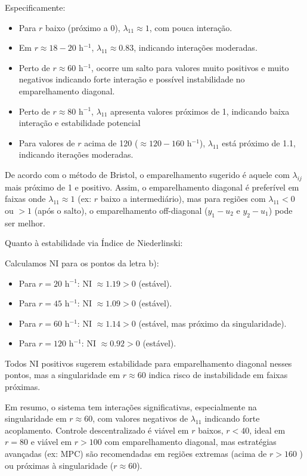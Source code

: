 \documentclass{article}
\begin{document}
Especificamente:
\begin{itemize}
  \item Para $r$ baixo (próximo a 0), $\lambda_{11} \approx 1$, com pouca interação.
  \item Em $r \approx 18-20$ h$^{-1}$, $\lambda_{11} \approx 0.83$, indicando interações moderadas.
  \item Perto de $r \approx 60$ h$^{-1}$, ocorre um salto para valores muito positivos e muito negativos indicando forte interação e possível instabilidade no emparelhamento diagonal.
  \item Perto de $r \approx 80$ h$^{-1}$, $\lambda_{11}$ apresenta valores próximos de 1, indicando baixa interação e estabilidade potencial
  \item Para valores de $r$ acima de 120 ($\approx 120-160$ h$^{-1}$), $\lambda_{11}$ está próximo de 1.1, indicando iterações moderadas.
\end{itemize}

De acordo com o método de Bristol, o emparelhamento sugerido é aquele com $\lambda_{ij}$ mais próximo de 1 e positivo. Assim, o emparelhamento diagonal é preferível em faixas onde $\lambda_{11} \approx 1$ (ex: $r$ baixo a intermediário), mas para regiões com $\lambda_{11} < 0$ ou $>1$ (após o salto), o emparelhamento off-diagonal ($y_1-u_2$ e $y_2-u_1$) pode ser melhor.

Quanto à estabilidade via Índice de Niederlinski:

Calculamos NI para os pontos da letra b):
\begin{itemize}
  \item Para $r=20$ h$^{-1}$: NI $\approx 1.19 > 0$ (estável).
  \item Para $r=45$ h$^{-1}$: NI $\approx 1.09 > 0$ (estável).
  \item Para $r=60$ h$^{-1}$: NI $\approx 1.14 > 0$ (estável, mas próximo da singularidade).
  \item Para $r=120$ h$^{-1}$: NI $\approx 0.92 > 0$ (estável).
\end{itemize}
Todos NI positivos sugerem estabilidade para emparelhamento diagonal nesses pontos, mas a singularidade em $r \approx 60$ indica risco de instabilidade em faixas próximas.

Em resumo, o sistema tem interações significativas, especialmente na singularidade em $r \approx 60$, com valores negativos de $\lambda_{11}$ indicando forte acoplamento. Controle descentralizado é viável em $r$ baixos, $r < 40$, ideal em $r = 80$ e viável em $r > 100$ com emparelhamento diagonal, mas estratégias avançadas (ex: MPC) são recomendadas em regiões extremas (acima de $r > 160$ ) ou próximas à singularidade ($r \approx 60$).
\end{document}
